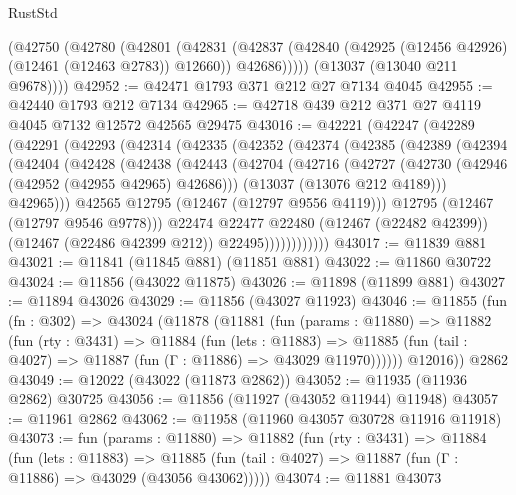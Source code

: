 \begin{lexlean}{RustStd}
\begin{coremodule}
        (@42750
          (@42780
            (@42801
              (@42831
                (@42837 (@42840 (@42925 (@12456 @42926) (@12461 (@12463 @2783)) @12660)) @42686)))))
        (@13037 (@13040 @211 @9678))))
@42952 := @42471 @1793 @371 @212 @27 @7134 @4045
@42955 := @42440 @1793 @212 @7134
@42965 := @42718 @439 @212 @371 @27 @4119 @4045 @7132 @12572 @42565 @29475
@43016 := @42221
    (@42247
      (@42289
        (@42291
          (@42293
            (@42314
              (@42335
                (@42352
                  (@42374
                    (@42385
                      (@42389
                        (@42394
                          (@42404
                            (@42428
                              (@42438
                                (@42443
                                  (@42704
                                    (@42716
                                      (@42727
                                        (@42730 (@42946 (@42952 (@42955 @42965) @42686)))
                                        (@13037 (@13076 @212 @4189)))
                                      @42965)))
                                @42565
                                @12795
                                (@12467 (@12797 @9556 @4119)))
                              @12795
                              (@12467 (@12797 @9546 @9778)))
                            @22474
                            @22477
                            @22480
                            (@12467 (@22482 @42399))
                            (@12467 (@22486 @42399 @212))
                            @22495))))))))))))
@43017 := @11839 @881
@43021 := @11841 (@11845 @881) (@11851 @881)
@43022 := @11860 @30722
@43024 := @11856 (@43022 @11875)
@43026 := @11898 (@11899 @881)
@43027 := @11894 @43026
@43029 := @11856 (@43027 @11923)
@43046 := @11855
    (fun (fn : @302) =>
    @43024
      (@11878
        (@11881
          (fun (params : @11880) =>
          @11882
            (fun (rty : @3431) =>
            @11884
              (fun (lets : @11883) =>
              @11885 (fun (tail : @4027) => @11887 (fun (Γ : @11886) => @43029 @11970))))))
        @12016))
    @2862
@43049 := @12022 (@43022 (@11873 @2862))
@43052 := @11935 (@11936 @2862) @30725
@43056 := @11856 (@11927 (@43052 @11944) @11948)
@43057 := @11961 @2862
@43062 := @11958 (@11960 @43057 @30728 @11916 @11918)
@43073 := fun (params : @11880) =>
  @11882
    (fun (rty : @3431) =>
    @11884
      (fun (lets : @11883) =>
      @11885 (fun (tail : @4027) => @11887 (fun (Γ : @11886) => @43029 (@43056 @43062)))))
@43074 := @11881 @43073

\end{coremodule}
\end{lexlean}
